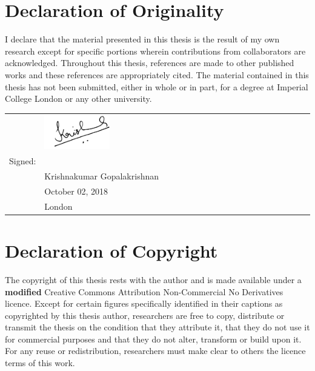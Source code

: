 
\chapter*{Declaration of Originality \hfill}

\vspace*{-1.0cm}

I declare that the material presented in this thesis is the result of my own
research except for  specific portions wherein contributions from collaborators
are acknowledged. Throughout this thesis, references are made to other published
works and these references are appropriately cited. The material contained in
this thesis has not been submitted, either in whole or in part, for a degree at
Imperial College London or any other university.\\[-3em]

\begin{flushright}
        \begin{tabular}{@{}p{.4in}p{2.1in}@{}}
            & \includegraphics[angle=-5,width=0.25\textwidth]{black_ink_sign_from_jpg}\\[-2em]
            Signed: & \hrulefill \\
                    & Krishnakumar Gopalakrishnan \\
                    & October 02, 2018\\
                    & London \\
        \end{tabular}
\end{flushright}

{\let\clearpage\relax \chapter*{Declaration of Copyright\hfill}}

\vspace*{-1cm}

\noindent  The copyright  of  this thesis  rests  with the  author  and is  made
available  under a \textbf{modified}  Creative Commons  Attribution
Non-Commercial  No Derivatives licence. Except for certain figures specifically
identified in their captions as copyrighted by this thesis author, researchers
are free to copy,  distribute or transmit the thesis on the condition  that they
attribute  it, that  they  do not  use  it for  commercial purposes and that
they  do not alter, transform or build upon  it. For any reuse or
redistribution,  researchers must make clear  to others the licence  terms of
this work.

\vfill

